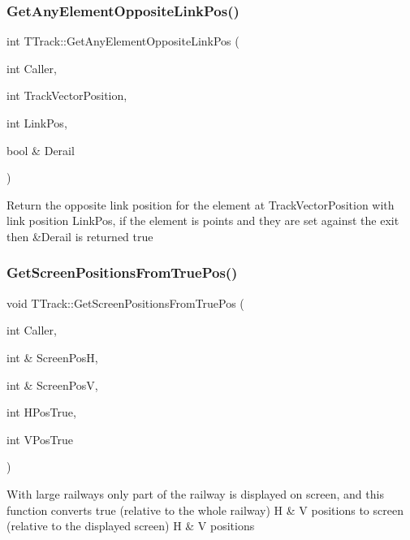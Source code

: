 \subsubsection{\texorpdfstring{Get\+Any\+Element\+Opposite\+Link\+Pos()}{GetAnyElementOppositeLinkPos()}}
{\footnotesize\ttfamily int T\+Track\+::\+Get\+Any\+Element\+Opposite\+Link\+Pos (\begin{DoxyParamCaption}\item[{int}]{Caller,  }\item[{int}]{Track\+Vector\+Position,  }\item[{int}]{Link\+Pos,  }\item[{bool \&}]{Derail }\end{DoxyParamCaption})}

Return the opposite link position for the element at Track\+Vector\+Position with link position Link\+Pos, if the element is points and they are set against the exit then \&Derail is returned true \mbox{\label{class_t_track_abda5d1209d5a197f1cefb851f567736d}} 
\subsubsection{\texorpdfstring{Get\+Screen\+Positions\+From\+True\+Pos()}{GetScreenPositionsFromTruePos()}}
{\footnotesize\ttfamily void T\+Track\+::\+Get\+Screen\+Positions\+From\+True\+Pos (\begin{DoxyParamCaption}\item[{int}]{Caller,  }\item[{int \&}]{Screen\+PosH,  }\item[{int \&}]{Screen\+PosV,  }\item[{int}]{H\+Pos\+True,  }\item[{int}]{V\+Pos\+True }\end{DoxyParamCaption})}

With large railways only part of the railway is displayed on screen, and this function converts true (relative to the whole railway) H \& V positions to screen (relative to the displayed screen) H \& V positions \mbox{\label{class_t_track_ac57ebd0462a3e0d8323e7b5cbc0e20ca}} 
